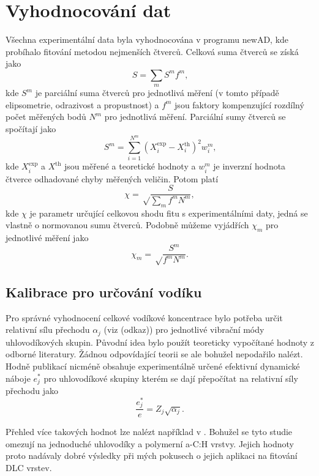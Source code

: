 \section{Vyhodnocování dat}
Všechna experimentální data byla vyhodnocována v programu newAD, kde probíhalo fitování metodou nejmenších čtverců. Celková suma čtverců se získá jako
%
\begin{equation} S = \sum_m S^m f^m \text{,}\end{equation}
%
kde $S^m$ je parciální suma čtverců pro jednotlivá měření (v tomto případě elipsometrie, odrazivost a propustnost) a $f^m$ jsou faktory kompenzující rozdílný počet měřených bodů $N^m$ pro jednotlivá měření. Parciální sumy čtverců se spočítají jako
%
\begin{equation} S^m = \sum_{i=1}^{N^m} (X_i^\mathrm{exp} - X_i^\mathrm{th})^2 w_i^m \text{,} \end{equation}
%
kde $X_i^\mathrm{exp}$ a $X^\mathrm{th}$ jsou měřené a teoretické hodnoty a $w_i^m$ je inverzní hodnota čtverce odhadované chyby měřených veličin. Potom platí \cite{Franta2011}
%
\begin{equation} \chi = \sqrt \frac{S}{\sum_m f^m N^m} \mathrm{,}\end{equation}
kde $\chi$ je parametr určující celkovou shodu fitu s experimentálními daty, jedná se vlastně o normovanou sumu čtverců. Podobně můžeme vyjádřích $\chi_m$ pro jednotlivé měření jako
%
\begin{equation} \chi_m = \sqrt \frac{S^m}{f^m N^m} \mathrm{.}\end{equation}

\subsection{Kalibrace pro určování vodíku}
Pro správné vyhodnocení celkové vodíkové koncentrace bylo potřeba určit relativní sílu přechodu $\alpha_j$ (viz (odkaz)) pro jednotlivé vibrační módy uhlovodíkových skupin. Původní idea bylo použít teoreticky vypočítané hodnoty z odborné literatury. Žádnou odpovídající teorii se ale bohužel nepodařilo nalézt. Hodně publikací nicméně obsahuje experimentálně určené efektivní dynamické náboje $e_j^*$ pro uhlovodíkové skupiny kterém se dají přepočítat na relativní síly přechodu jako \cite{sumrule2}
\begin{equation}
\frac{e_j^*}{e} = Z_j \sqrt{\alpha_j} \text{.}
\label{efch2str}
\end{equation}

Přehled více takových hodnot lze nalézt například v \cite{Heitz1998}. Bohužel se tyto studie omezují na jednoduché uhlovodíky a polymerní a-C:H vrstvy. Jejich hodnoty proto nadávaly dobré výsledky při mých pokusech o jejich aplikaci na fitování DLC vrstev. 

